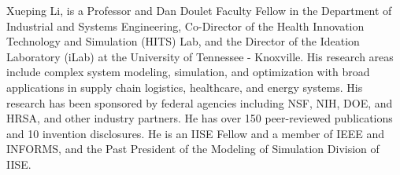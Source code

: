\documentclass[lettersize,journal]{IEEEtran}
\begin{document}
\begin{IEEEbiography}
  {Xueping Li}, is a Professor and Dan Doulet Faculty Fellow in the Department of Industrial and Systems Engineering, Co-Director of the Health Innovation Technology and Simulation (HITS) Lab, and the Director of the Ideation Laboratory (iLab) at the University of Tennessee - Knoxville. His research areas include complex system modeling, simulation, and optimization with broad applications in supply chain logistics, healthcare, and energy systems. His research has been sponsored by federal agencies including NSF, NIH, DOE, and HRSA, and other industry partners. He has over 150 peer-reviewed publications and 10 invention disclosures. He is an IISE Fellow and a member of IEEE and INFORMS, and the Past President of the Modeling of Simulation Division of IISE.
  \end{IEEEbiography}
\vspace{11pt}








\vfill
\end{document}
